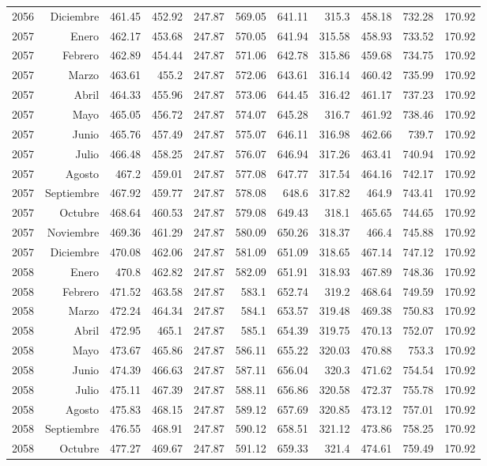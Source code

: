 \documentclass{article}%
\begin{document}
\begin{longtable}{|l r|r|r|r|r|r|r|r|r|r|}
2056&Diciembre&461.45&452.92&247.87&569.05&641.11&315.3&458.18&732.28&170.92\\%
2057&Enero&462.17&453.68&247.87&570.05&641.94&315.58&458.93&733.52&170.92\\%
2057&Febrero&462.89&454.44&247.87&571.06&642.78&315.86&459.68&734.75&170.92\\%
2057&Marzo&463.61&455.2&247.87&572.06&643.61&316.14&460.42&735.99&170.92\\%
2057&Abril&464.33&455.96&247.87&573.06&644.45&316.42&461.17&737.23&170.92\\%
2057&Mayo&465.05&456.72&247.87&574.07&645.28&316.7&461.92&738.46&170.92\\%
2057&Junio&465.76&457.49&247.87&575.07&646.11&316.98&462.66&739.7&170.92\\%
2057&Julio&466.48&458.25&247.87&576.07&646.94&317.26&463.41&740.94&170.92\\%
2057&Agosto&467.2&459.01&247.87&577.08&647.77&317.54&464.16&742.17&170.92\\%
2057&Septiembre&467.92&459.77&247.87&578.08&648.6&317.82&464.9&743.41&170.92\\%
2057&Octubre&468.64&460.53&247.87&579.08&649.43&318.1&465.65&744.65&170.92\\%
2057&Noviembre&469.36&461.29&247.87&580.09&650.26&318.37&466.4&745.88&170.92\\%
2057&Diciembre&470.08&462.06&247.87&581.09&651.09&318.65&467.14&747.12&170.92\\%
2058&Enero&470.8&462.82&247.87&582.09&651.91&318.93&467.89&748.36&170.92\\%
2058&Febrero&471.52&463.58&247.87&583.1&652.74&319.2&468.64&749.59&170.92\\%
2058&Marzo&472.24&464.34&247.87&584.1&653.57&319.48&469.38&750.83&170.92\\%
2058&Abril&472.95&465.1&247.87&585.1&654.39&319.75&470.13&752.07&170.92\\%
2058&Mayo&473.67&465.86&247.87&586.11&655.22&320.03&470.88&753.3&170.92\\%
2058&Junio&474.39&466.63&247.87&587.11&656.04&320.3&471.62&754.54&170.92\\%
2058&Julio&475.11&467.39&247.87&588.11&656.86&320.58&472.37&755.78&170.92\\%
2058&Agosto&475.83&468.15&247.87&589.12&657.69&320.85&473.12&757.01&170.92\\%
2058&Septiembre&476.55&468.91&247.87&590.12&658.51&321.12&473.86&758.25&170.92\\%
2058&Octubre&477.27&469.67&247.87&591.12&659.33&321.4&474.61&759.49&170.92\\%

\end{longtable}
\end{document}
